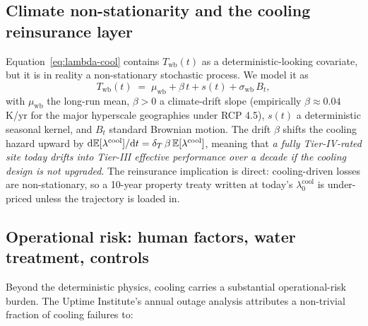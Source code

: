 \subsection{Climate non-stationarity and the cooling reinsurance layer}\label{ss:cool-climate}

Equation~\eqref{eq:lambda-cool} contains $T_{\mathrm{wb}}(t)$ as a
deterministic-looking covariate, but it is in reality a non-stationary
stochastic process. We model it as
\begin{equation}\label{eq:Twb-process}
   T_{\mathrm{wb}}(t) \;=\; \mu_{\mathrm{wb}}
   + \beta\, t
   + s(t)
   + \sigma_{\mathrm{wb}}\,B_t,
\end{equation}
with $\mu_{\mathrm{wb}}$ the long-run mean, $\beta>0$ a climate-drift
slope (empirically $\beta\approx 0.04$ K/yr for the major
hyperscale geographies under RCP 4.5), $s(t)$ a deterministic
seasonal kernel, and $B_t$ standard Brownian motion. The drift
$\beta$ shifts the cooling hazard upward by
$\mathrm{d}\mathbb{E}[\lambda^{\mathrm{cool}}]/\mathrm{d} t = \delta_T\,\beta\,
\mathbb{E}[\lambda^{\mathrm{cool}}]$, meaning that
\emph{a fully Tier-IV-rated site today drifts into Tier-III
effective performance over a decade if the cooling design is not
upgraded}. The reinsurance implication is direct: cooling-driven
losses are non-stationary, so a 10-year property treaty written at
today's $\lambda^{\mathrm{cool}}_0$ is under-priced unless the
trajectory is loaded in.

\subsection{Operational risk: human factors, water treatment, controls}\label{ss:cool-ops}

Beyond the deterministic physics, cooling carries a substantial
operational-risk burden. The Uptime Institute's annual outage
analysis attributes a non-trivial fraction of cooling failures to:

